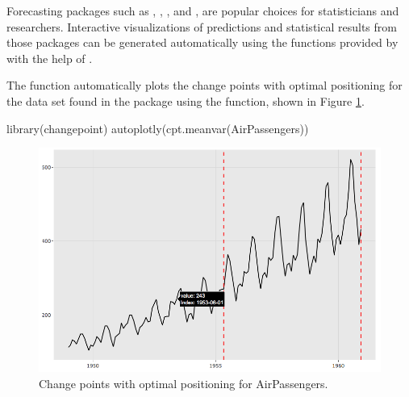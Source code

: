 Forecasting packages such as  \citep{forecast},
 \citep{changepoint}, 
\citep{strucchange}, and  \citep{dlm}, are popular choices
for statisticians and researchers. Interactive visualizations of
predictions and statistical results from those packages can be generated
automatically using the functions provided by  with the
help of .

The  function automatically plots the change points with
optimal positioning for the  data set found in the
 package using the  function, shown
in Figure \ref{figure:changepoint_caption}.

\begin{Schunk}
\begin{Sinput}
library(changepoint)
autoplotly(cpt.meanvar(AirPassengers))
\end{Sinput}
\end{Schunk}

\begin{figure}[htbp]
  \centering
  \includegraphics[width=145mm,scale=0.8]{images/changepoint_caption.png}
  \caption{Change points with optimal positioning for AirPassengers.}
  \label{figure:changepoint_caption}
\end{figure}

